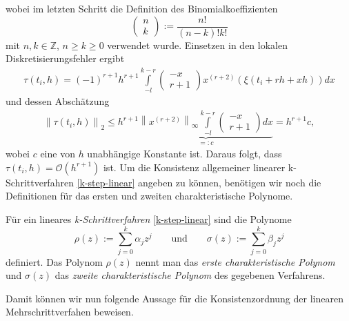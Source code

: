 wobei im letzten Schritt die Definition des Binomialkoeffizienten
\[
    \begin{pmatrix} n \\ k  \end{pmatrix} := \frac{n!}{(n-k)!k!}
\]
mit $n,k \in \mathbb{Z}$, $n\geq k \geq 0$ verwendet wurde. Einsetzen in den lokalen Diskretisierungsfehler ergibt
\begin{align*}
    \tau(t_i,h) = (-1)^{r+1} h^{r+1} \int\limits_{-l}^{k-r} \begin{pmatrix} -x \\ r+1 \end{pmatrix}
    x^{(r+2)}(\xi(t_i+rh+xh))dx
\end{align*}
und dessen Abschätzung
\begin{align*}
    \left\lVert \tau(t_i,h) \right\rVert_2 \leq h^{r+1}
    \underbrace{
        \left\lVert x^{(r+2)}\right\rVert_{\infty}\int\limits_{-l}^{k-r} \begin{pmatrix} -x \\ r+1 \end{pmatrix} dx
    }_{=:c} = h^{r+1}c,
\end{align*}
wobei $c$ eine von $h$ unabhängige Konstante ist. Daraus folgt, dass $\tau(t_i, h)=\mathcal{O}(h^{r+1})$ ist. \qedwhite
Um die Konsistenz allgemeiner linearer k-Schrittverfahren \eqref{k-step-linear} angeben zu können, benötigen wir noch
die Definitionen für das ersten und zweiten charakteristische Polynome.
\begin{definition}
    Für ein lineares \textit{k-Schrittverfahren} \eqref{k-step-linear} sind die Polynome
    \[
        \rho(z) := \sum_{j=0}^{k} \alpha_j z^j \qquad \text{und} \qquad \sigma(z) := \sum_{j=0}^{k} \beta_j z^j
    \]
    definiert. Das Polynom $\rho(z)$ nennt man das {\em erste charakteristische Polynom} und $\sigma(z)$ das
    {\em zweite charakteristische Polynom} des gegebenen Verfahrens.
\end{definition}
Damit können wir nun folgende Aussage für die Konsistenzordnung der linearen Mehrschrittverfahen beweisen.
